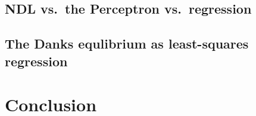 \documentclass[t]{beamer} %
\begin{document}


\subsection{NDL vs.\ the Perceptron vs.\  regression}



\subsection{The Danks equlibrium as least-squares regression}





% 



\section{Conclusion}






\end{document}
